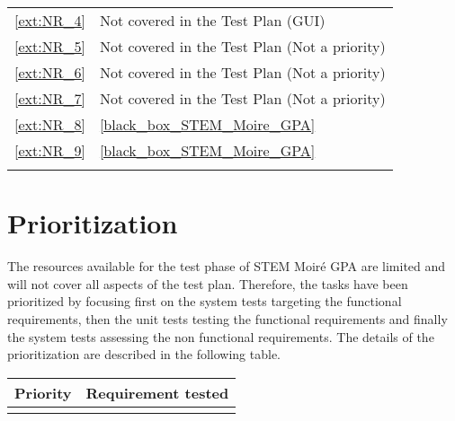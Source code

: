 \documentclass[12pt, titlepage]{article}
\newcommand{\progname}{STEM Moir{\'e} GPA}
\begin{document}
\begin{longtable}{l p{10cm}}
\cref{ext:NR_4} & Not covered in the Test Plan (GUI)\\
\cref{ext:NR_5} & Not covered in the Test Plan (Not a priority)\\
\cref{ext:NR_6} & Not covered in the Test Plan (Not a priority)\\
\cref{ext:NR_7} & Not covered in the Test Plan (Not a priority)\\
\cref{ext:NR_8} & \cref{black_box_STEM_Moire_GPA}\\
\cref{ext:NR_9} & \cref{black_box_STEM_Moire_GPA}\\
\bottomrule
\label{table_traceability}
\end{longtable}

\section{Prioritization}	
The resources available for the test phase of \progname{} are limited  and will not cover all aspects of the test plan. Therefore, the tasks have been prioritized by focusing first on the system tests targeting the functional requirements, then the unit tests testing the functional requirements and finally the system tests assessing the non functional requirements. The details of the prioritization are described in the following table.

\noindent 
\begin{longtable}{l p{10cm}} 
\toprule
\textbf{Priority} & \textbf{Requirement tested}\\
\midrule
\endhead
\bottomrule
\label{priority_table}
\end{longtable}




\newpage
\end{document}
